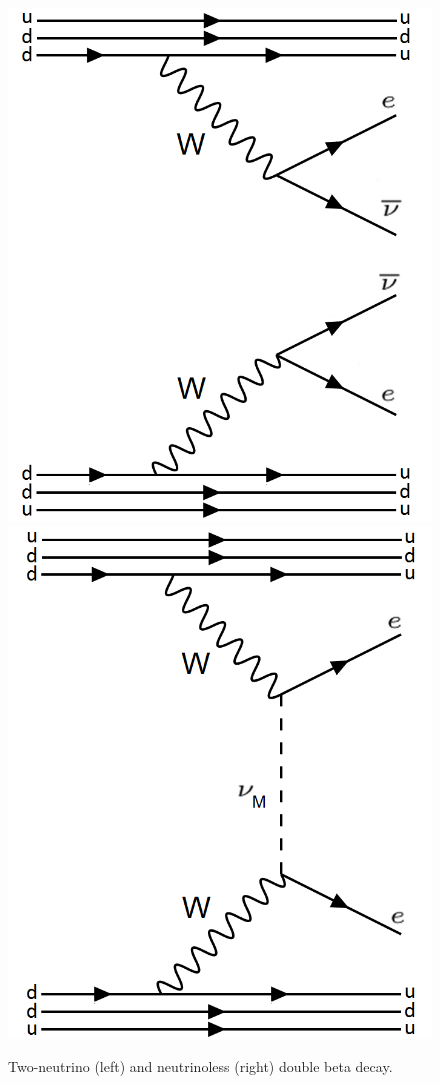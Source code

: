 \begin{figure} %
                \includegraphics[width=.35\textwidth]{figures/feynman_2nu_quarks.png}
                \includegraphics[width=.35\textwidth]{figures/feynman_0nu_quarks.png}
                \caption{Two-neutrino (left) and neutrinoless (right) double beta decay.}
        \label{fig:feynman_diags}
\end{figure}


